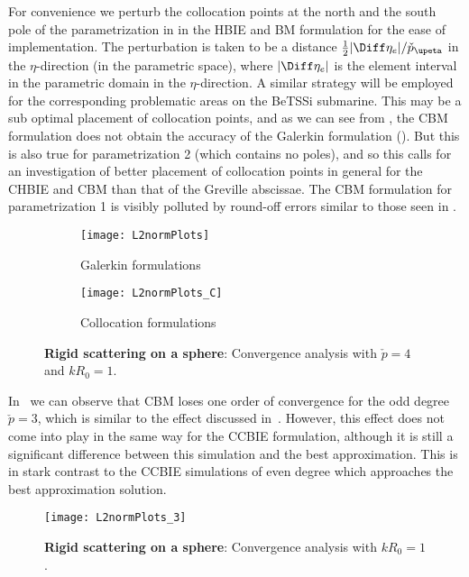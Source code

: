 For convenience we perturb the collocation points at the north and the south pole of the parametrization in  in the HBIE and BM formulation for the ease of implementation. The perturbation is taken to be a distance $\frac12|\Diff\eta_e|/\check{p}_\upeta$ in the $\eta$-direction (in the parametric space), where $|\Diff\eta_e|$ is the element interval in the parametric domain in the $\eta$-direction. A similar strategy will be employed for the corresponding problematic areas on the BeTSSi submarine. This may be a sub optimal placement of collocation points, and as we can see from , the CBM formulation does not obtain the accuracy of the Galerkin formulation (). But this is also true for parametrization 2 (which contains no poles), and so this calls for an investigation of better placement of collocation points in general for the CHBIE and CBM than that of the Greville abscissae. The CBM formulation for parametrization 1 is visibly polluted by round-off errors similar to those seen in .
\begin{figure}
	\centering
	\begin{subfigure}[t]{\textwidth}
		\centering
		\texttt{[image: L2normPlots]}
		\caption{Galerkin formulations}
		\label{Fig3:S1parmCompG}
	\end{subfigure}
	\par\bigskip
	\par\bigskip
	\begin{subfigure}[t]{\textwidth}
		\centering
		\texttt{[image: L2normPlots\_C]}
		\caption{Collocation formulations}
		\label{Fig3:S1parmCompC}
	\end{subfigure}
	\caption{\textbf{Rigid scattering on a sphere}: Convergence analysis with $\check{p}=4$ and $kR_0=1$.}
	\label{Fig3:S1parmComp}
\end{figure}

In~ we can observe that CBM loses one order of convergence for the odd degree $\check{p}=3$, which is similar to the effect discussed in~\cite{Gomez2016tvc}. However, this effect does not come into play in the same way for the CCBIE formulation, although it is still a significant difference between this simulation and the best approximation. This is in stark contrast to the CCBIE simulations of even degree which approaches the best approximation solution.
\begin{figure}
	\centering
	\texttt{[image: L2normPlots\_3]}
	\caption{\textbf{Rigid scattering on a sphere}: Convergence analysis with $kR_0=1$.}
	\label{Fig3:S1_cgComp}
\end{figure}

